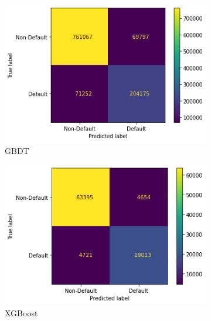 \documentclass[twoside,11pt,a4paper]{article}
\begin{document}
\begin{figure}[h!]
\begin{subfigure}{0.4 \textwidth}
		\includegraphics[width=1\linewidth, height=0.8\linewidth]{cm_gbdt}
		\caption[Gradient Boosting Decision Tree]{\acs{GBDT}}
		\label{fig:cm_gbdt}
	\end{subfigure}
	\hfill
	\begin{subfigure}{0.4 \textwidth}
		\includegraphics[width=1\linewidth, height=0.8\linewidth]{cm_xgboost}
		\caption[Xtreme Gradient Boosting Descision Tree]{\acs{XGBoost}}
		\label{fig:cm_xgboost}
	\end{subfigure}
	\begin{subfigure}{0.4 \textwidth}

\end{subfigure}
\end{figure}
\end{document}
